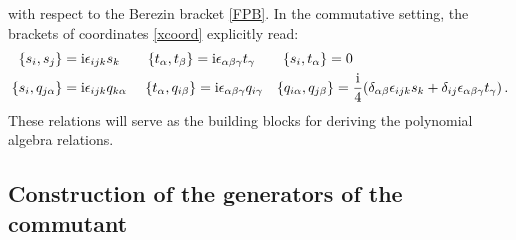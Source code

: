 \documentclass[10pt]{amsart}
\theoremstyle{definition}
\theoremstyle{corollary}
\theoremstyle{remark}
\theoremstyle{conclusion}
\begin{document}
with respect to the Berezin bracket  \eqref{FPB}. In the commutative setting, the brackets of coordinates \eqref{xcoord} explicitly read:
\begin{equation}
\begin{split}
\{s_i, s_j\}&={\rm i} \epsilon_{ijk}s_k \qquad \{t_\alpha, t_\beta\}={\rm i} \epsilon_{\alpha \beta \gamma}t_\gamma \qquad \{s_i, t_\alpha\}=0 \\
\{s_i,q_{j\alpha}\}&={\rm i} \epsilon_{ijk} q_{k \alpha} \quad \,\, \{t_\alpha, q_{i\beta}\}={\rm i} \epsilon_{\alpha \beta \gamma} q_{i \gamma} \quad \{q_{i \alpha}, q_{j \beta}\}=\frac{{\rm i}}{4}(\delta_{\alpha \beta} \epsilon_{ijk}s_k+\delta_{ij}\epsilon_{\alpha \beta \gamma}t_\gamma) \, .
\label{classicalrels}
\end{split}
\end{equation}
 These relations will serve as the building blocks for deriving the polynomial algebra relations.
\vskip 0.5cm

\subsection{Construction of the generators of the commutant}
\label{subsec3.2}
\end{document}
